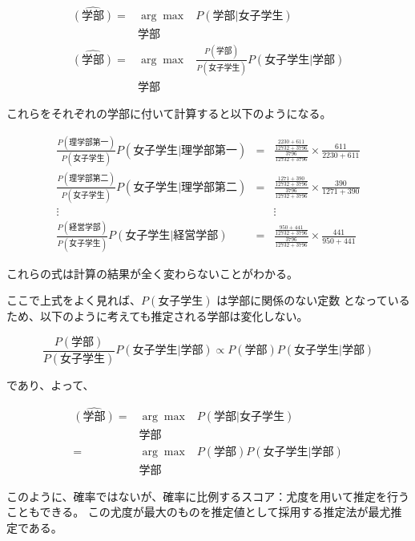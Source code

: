 \documentclass{jsarticle}
\begin{document}
    \begin{eqnarray*}
      \hat{(\mbox{学部})} = &\arg \max& P(学部 | 女子学生) \\
                            &学部&                         \\
      \hat{(\mbox{学部})} = &\arg \max& \frac{P(学部)}{P(女子学生)}P(女子学生 | 学部) \\
                            &学部&
    \end{eqnarray*}

    これらをそれぞれの学部に付いて計算すると以下のようになる。

    \begin{eqnarray*}
      \frac{P(\mbox{理学部第一})}{P(女子学生)}P(\mbox{女子学生} | \mbox{理学部第一}) &=&
      \frac{\frac{2230 + 611}{12732 + 3796}}{\frac{3796}{12732 + 3796}} \times
      \frac{611}{2230 + 611} \\
      \frac{P(\mbox{理学部第二})}{P(女子学生)}P(\mbox{女子学生} | \mbox{理学部第二}) &=&
      \frac{\frac{1271 + 390}{12732 + 3796}}{\frac{3796}{12732 + 3796}} \times
      \frac{390}{1271 + 390} \\
      \vdots &   & \vdots \\
      \frac{P(\mbox{経営学部})}{P(女子学生)}P(\mbox{女子学生} | \mbox{経営学部}) &=&
      \frac{\frac{950 + 441}{12732 + 3796}}{\frac{3796}{12732 + 3796}} \times
      \frac{441}{950 + 441}
    \end{eqnarray*}

    これらの式は計算の結果が全く変わらないことがわかる。

    ここで上式をよく見れば、$P(\mbox{女子学生})$ は学部に関係のない定数
    となっているため、以下のように考えても推定される学部は変化しない。

    $$
    \frac{P(\mbox{学部})}{P(\mbox{女子学生})}P(\mbox{女子学生} | \mbox{学部}) \propto P(\mbox{学部})P(\mbox{女子学生} | \mbox{学部})
    $$

    であり、よって、

    \begin{eqnarray*}
    \hat{(\mbox{学部})} = &\arg \max& P(学部 | 女子学生) \\
                         &学部& \\
                       = &\arg \max& P(\mbox{学部})P(\mbox{女子学生} | \mbox{学部}) \\
                         &学部&
    \end{eqnarray*}

    このように、確率ではないが、確率に比例するスコア：尤度を用いて推定を行うこともできる。
    この尤度が最大のものを推定値として採用する推定法が最尤推定である。
\end{document}
